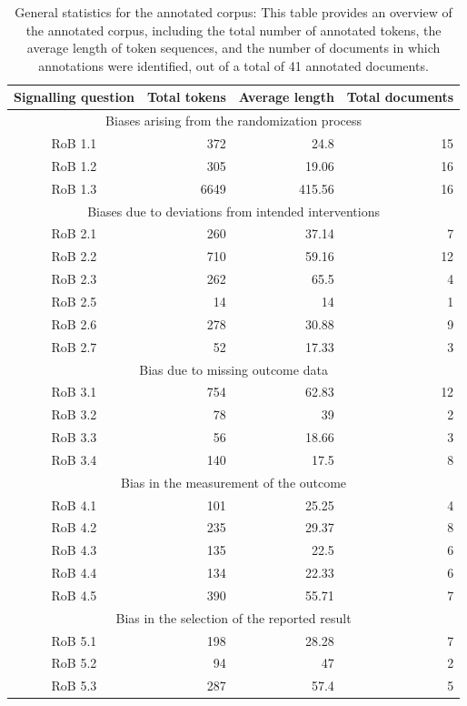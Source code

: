\documentclass[sn-mathphys,Numbered]{sn-jnl}%
\theoremstyle{thmstyleone}%
\theoremstyle{thmstyletwo}%
\theoremstyle{thmstylethree}%
\begin{document}
%
%
%
\begin{table}[htb]
    \centering
    \caption{General statistics for the annotated corpus: This table provides an overview of the annotated corpus, including the total number of annotated tokens, the average length of token sequences, and the number of documents in which annotations were identified, out of a total of 41 annotated documents.}
    \label{table:stats}
    \begin{tabular}{crrr}
    \toprule[1.0pt]
        Signalling question & Total tokens & Average length & Total documents \\
    \midrule[1.0pt]
        \multicolumn{4}{c}{Biases arising from the randomization process} \\
        \hline
        RoB 1.1 & 372 & 24.8 & 15 \\ 
        RoB 1.2 & 305 & 19.06 & 16 \\ 
        RoB 1.3 & 6649 & 415.56 & 16 \\ 
        \hline
        \multicolumn{4}{c}{Biases due to deviations from intended interventions} \\
        \hline
        RoB 2.1 & 260 & 37.14 & 7 \\ 
        RoB 2.2 & 710 & 59.16 & 12 \\ 
        RoB 2.3 & 262 & 65.5 & 4 \\ 
        RoB 2.5 & 14 & 14 & 1 \\ 
        RoB 2.6 & 278 & 30.88 & 9 \\ 
        RoB 2.7 & 52 & 17.33 & 3 \\ 
        \hline
        \multicolumn{4}{c}{Bias due to missing outcome data} \\
        \hline
        RoB 3.1 & 754 & 62.83 & 12 \\ 
        RoB 3.2 & 78 & 39 & 2 \\ 
        RoB 3.3 & 56 & 18.66 & 3 \\ 
        RoB 3.4 & 140 & 17.5 & 8 \\ 
        \hline
        \multicolumn{4}{c}{Bias in the measurement of the outcome} \\
        \hline
        RoB 4.1 & 101 & 25.25 & 4 \\ 
        RoB 4.2 & 235 & 29.37 & 8 \\ 
        RoB 4.3 & 135 & 22.5 & 6 \\ 
        RoB 4.4 & 134 & 22.33 & 6 \\ 
        RoB 4.5 & 390 & 55.71 & 7 \\ 
        \hline
        \multicolumn{4}{c}{Bias in the selection of the reported result} \\
        \hline
        RoB 5.1 & 198 & 28.28 & 7 \\ 
        RoB 5.2 & 94 & 47 & 2 \\ 
        RoB 5.3 & 287 & 57.4 & 5 \\
    \bottomrule[1.0pt]
    \end{tabular}
\end{table}
%
%
%
\end{document}
